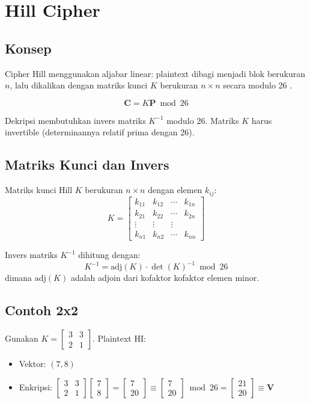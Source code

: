 \section{Hill Cipher}

\subsection{Konsep}

Cipher Hill menggunakan aljabar linear: plaintext dibagi menjadi blok berukuran $n$, lalu dikalikan dengan matriks kunci $K$ berukuran $n \times n$ secara modulo 26 \cite{stallings2017,trappe2006}. 

\[
\mathbf{C} = K \mathbf{P} \bmod 26
\]

Dekripsi membutuhkan invers matriks $K^{-1}$ modulo 26. Matriks $K$ harus invertible (determinannya relatif prima dengan 26).

\subsection{Matriks Kunci dan Invers}

Matriks kunci Hill $K$ berukuran $n \times n$ dengan elemen $k_{ij}$:
\[
K = \begin{bmatrix}k_{11} & k_{12} & \cdots & k_{1n} \\ k_{21} & k_{22} & \cdots & k_{2n} \\ \vdots & \vdots & \vdots \\ k_{n1} & k_{n2} & \cdots & k_{nn} \end{bmatrix}
\]

Invers matriks $K^{-1}$ dihitung dengan:
\[
K^{-1} = \text{adj}(K) \cdot \det(K)^{-1} \bmod 26
\]
dimana $\text{adj}(K)$ adalah adjoin dari kofaktor kofaktor elemen minor.

\subsection{Contoh 2x2}

Gunakan $K=\begin{bmatrix}3 & 3\\ 2 & 1\end{bmatrix}$. Plaintext HI:
\begin{itemize}
  \item Vektor: $(7, 8)$
  \item Enkripsi: $\begin{bmatrix}3 & 3\\ 2 & 1\end{bmatrix} \begin{bmatrix}7\\ 8\end{bmatrix} = \begin{bmatrix}7\\ 20\end{bmatrix} \equiv \begin{bmatrix}7\\ 20\end{bmatrix} \bmod 26 = \begin{bmatrix}21\\ 20\end{bmatrix} \equiv \textbf{V}$
\end{itemize}

